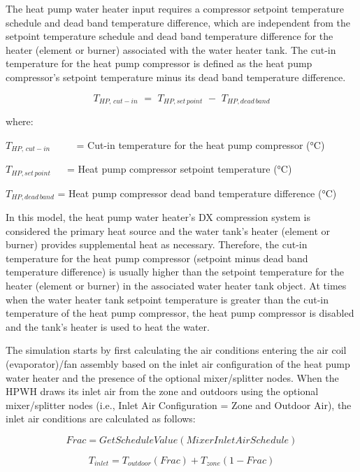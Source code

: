 The heat pump water heater input requires a compressor setpoint temperature schedule and dead band temperature difference, which are independent from the setpoint temperature schedule and dead band temperature difference for the heater (element or burner) associated with the water heater tank. The cut-in temperature for the heat pump compressor is defined as the heat pump compressor's setpoint temperature minus its dead band temperature difference.

\begin{equation}
{T_{HP,\,cut - in}}\,\, = \,\,{T_{HP,set\,point}}\,\, - \,\,{T_{HP,dead\,band}}
\end{equation}

where:

\({T_{HP,\,cut - in}}\) ~~~~ = Cut-in temperature for the heat pump compressor (°C)

\({T_{HP,set\,point}}\) ~~ = Heat pump compressor setpoint temperature (°C)

\({T_{HP,dead\,band}}\) = Heat pump compressor dead band temperature difference (°C)

In this model, the heat pump water heater's DX compression system is considered the primary heat source and the water tank's heater (element or burner) provides supplemental heat as necessary. Therefore, the cut-in temperature for the heat pump compressor (setpoint minus dead band temperature difference) is usually higher than the setpoint temperature for the heater (element or burner) in the associated water heater tank object. At times when the water heater tank setpoint temperature is greater than the cut-in temperature of the heat pump compressor, the heat pump compressor is disabled and the tank's heater is used to heat the water.

The simulation starts by first calculating the air conditions entering the air coil (evaporator)/fan assembly based on the inlet air configuration of the heat pump water heater and the presence of the optional mixer/splitter nodes. When the HPWH draws its inlet air from the zone and outdoors using the optional mixer/splitter nodes (i.e., Inlet Air Configuration = Zone and Outdoor Air), the inlet air conditions are calculated as follows:

\begin{equation}
Frac = GetScheduleValue(MixerInletAirSchedule)
\end{equation}

\begin{equation}
{T_{inlet}} = {T_{outdoor}}\left( {Frac} \right) + {T_{zone}}\left( {1 - Frac} \right)
\end{equation}

